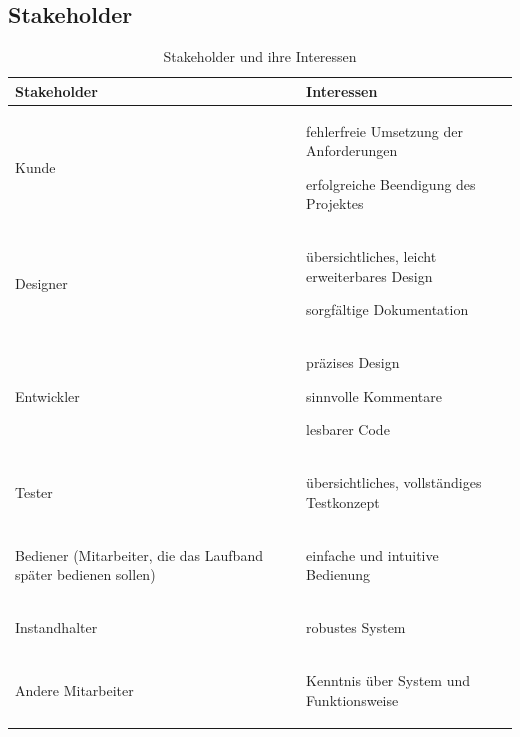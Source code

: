 \documentclass[a4paper, 11pt]{article}
\begin{document}
\subsection{Stakeholder}
\begin{table}[H]
\centering
    \begin{tabularx}{\textwidth}{|X|X|}
    \hline
    \textbf{Stakeholder}&\textbf{Interessen}\\
    \hline
    Kunde&\begin{compactenum}[-]
        \item fehlerfreie Umsetzung der Anforderungen
        \item erfolgreiche Beendigung des Projektes 
    \end{compactenum}\\
    \hline
    Designer&\begin{compactenum}[-]
        \item übersichtliches, leicht erweiterbares Design
        \item sorgfältige Dokumentation 
    \end{compactenum}\\ 
    \hline
    Entwickler&\begin{compactenum}[-]
        \item präzises Design
        \item sinnvolle Kommentare
        \item lesbarer Code 
    \end{compactenum}\\
    \hline
    Tester&\begin{compactenum}[-]
        \item übersichtliches, vollständiges Testkonzept 
    \end{compactenum}\\
    \hline
    Bediener (Mitarbeiter, die das Laufband später bedienen sollen)&\begin{compactenum}[-]
        \item einfache und intuitive Bedienung
    \end{compactenum}\\
    \hline
    Instandhalter&\begin{compactenum}[-]
        \item robustes System
    \end{compactenum}\\
    \hline
    Andere Mitarbeiter&\begin{compactenum}[-]
        \item Kenntnis über System und Funktionsweise
    \end{compactenum}\\
    \hline
    \end{tabularx}
    \caption{Stakeholder und ihre Interessen}
    \label{stake}
\end{table}
\end{document}
